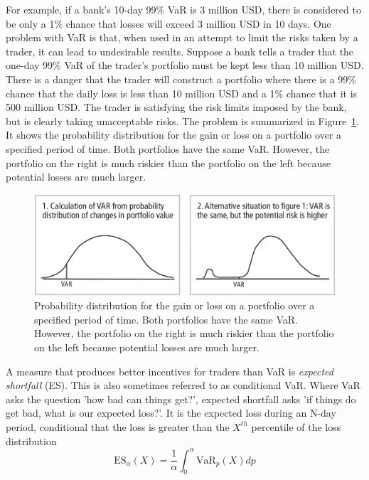 For example, if a bank's 10-day 99\% VaR is 3 million USD, there is considered to be only a 1\% chance that losses will exceed 3 million USD in 10 days. One problem with VaR is that, when used in an attempt to limit the risks taken by a trader, it can lead to undesirable results. Suppose a bank tells a trader that the one-day 99\% VaR of the trader's portfolio must be kept less than 10 million USD. There is a danger that the trader will construct a portfolio where there is a 99\% chance that the daily loss is less than 10 million USD and a 1\% chance that it is 500 million USD. The trader is satisfying the risk limits imposed by the bank, but is clearly taking unacceptable risks. 
The problem is summarized in Figure~\ref{fig:var_vs_badvar}. It shows the probability distribution for the gain or loss on a portfolio over a specified period of time. Both portfolios have the same VaR. However, the portfolio on the right is much riskier than the portfolio on the left because potential losses are much larger. 

\begin{figure}[htb]
\centering
\includegraphics[width=0.8\linewidth]{figures/var_badvar}
\caption{Probability distribution for the gain or loss on a portfolio over a specified period of time. Both portfolios have the same VaR. However, the portfolio on the right is much riskier than the portfolio on the left because potential losses are much larger.}
\label{fig:var_vs_badvar}
\end{figure}

A measure that produces better incentives for traders than VaR is \emph{expected shortfall} (ES). This is also sometimes referred to as conditional VaR. Where VaR asks the question 'how bad can things get?', expected shortfall asks 'if things do get bad, what is our expected loss?'. It is the expected loss during an N-day period, conditional that the loss is greater than the $X^{th}$ percentile of the loss distribution
\begin{equation}
\text{ES}_{\alpha}(X) = \frac{1}{\alpha}\int_0^\alpha \text{VaR}_p(X) dp
\label{eq:es}
\end{equation}

